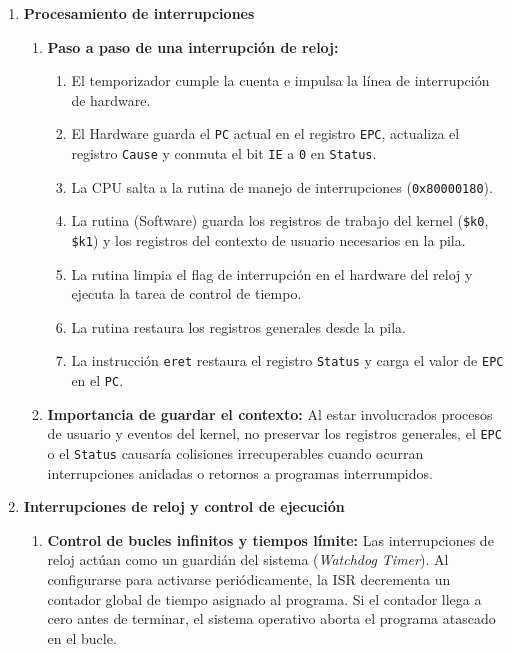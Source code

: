 \documentclass[12pt,letterpaper]{article}
\begin{document}
\begin{enumerate}
    \item \textbf{\large\color{UCBlue}Procesamiento de interrupciones}
    
    \vspace{0.2cm}
    \begin{enumerate}[label=\alph*)]
        \item \textbf{Paso a paso de una interrupción de reloj:}
        \begin{enumerate}[label=\arabic*.]
            \item El temporizador cumple la cuenta e impulsa la línea de interrupción de hardware.
            \item El Hardware guarda el \texttt{PC} actual en el registro \texttt{EPC}, actualiza el registro \texttt{Cause} y conmuta el bit \texttt{IE} a \texttt{0} en \texttt{Status}.
            \item La CPU salta a la rutina de manejo de interrupciones (\texttt{0x80000180}).
            \item La rutina (Software) guarda los registros de trabajo del kernel (\texttt{\$k0}, \texttt{\$k1}) y los registros del contexto de usuario necesarios en la pila.
            \item La rutina limpia el flag de interrupción en el hardware del reloj y ejecuta la tarea de control de tiempo.
            \item La rutina restaura los registros generales desde la pila.
            \item La instrucción \texttt{eret} restaura el registro \texttt{Status} y carga el valor de \texttt{EPC} en el \texttt{PC}.
        \end{enumerate}
        
        \item \textbf{Importancia de guardar el contexto:}
        Al estar involucrados procesos de usuario y eventos del kernel, no preservar los registros generales, el \texttt{EPC} o el \texttt{Status} causaría colisiones irrecuperables cuando ocurran interrupciones anidadas o retornos a programas interrumpidos.
    \end{enumerate}

    \item \textbf{\large\color{UCBlue}Interrupciones de reloj y control de ejecución}
    
    \vspace{0.2cm}
    \begin{enumerate}[label=\alph*)]
        \item \textbf{Control de bucles infinitos y tiempos límite:}
        Las interrupciones de reloj actúan como un guardián del sistema (\textit{Watchdog Timer}). Al configurarse para activarse periódicamente, la ISR decrementa un contador global de tiempo asignado al programa. Si el contador llega a cero antes de terminar, el sistema operativo aborta el programa atascado en el bucle.
        

\end{enumerate}
\end{enumerate}
\end{document}

